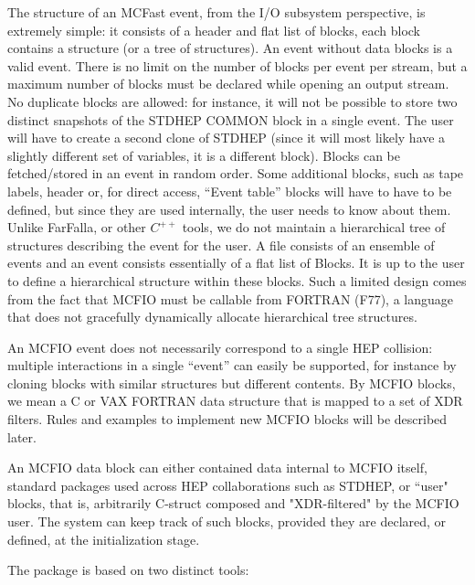 The structure of an MCFast event, from the I/O subsystem perspective, is
extremely simple: it consists of a header and flat list of blocks, each block
contains  a structure (or a tree of structures). An event without data blocks
is a valid event. There is no limit on the number of blocks per event per
stream, but a maximum number of blocks must be declared while opening an output
stream.    No duplicate blocks are allowed:  for instance, it will not be
possible to store two distinct snapshots of the STDHEP COMMON block in a single
event. The user will have to  create a second clone of STDHEP (since it will
most likely have a slightly different set of variables, it is a different
block).  Blocks can be fetched/stored in an  event in random order. Some
additional blocks, such as tape labels, header or, for direct access, ``Event
table'' blocks will have to have to be defined, but since they are used
internally, the user needs to know about them.  Unlike FarFalla, or other
$C^{++}$ tools, we do not maintain a hierarchical tree of structures
describing the event for the user. A file consists of an ensemble of events
and an event consists essentially of a flat list of Blocks. It is up to the
user to define a hierarchical structure within these blocks. Such a limited design
comes from the fact that MCFIO must be callable from FORTRAN (F77), a language
that does not gracefully dynamically allocate hierarchical tree
structures.

	An MCFIO event does not necessarily correspond to a single HEP
collision:  multiple interactions in a single ``event'' can easily be
supported, for instance by cloning blocks with similar structures but
different contents. By MCFIO blocks, we mean a C or VAX FORTRAN data
structure that is mapped to a set of XDR filters. Rules and examples to
implement new MCFIO blocks will be described later.

	An MCFIO data block can either contained data internal to MCFIO itself,
standard packages used across HEP collaborations such as STDHEP, or ``user"
blocks, that is, arbitrarily C-struct composed and "XDR-filtered" by the
MCFIO user. The system can keep track of such blocks, provided they are
declared, or defined, at the initialization stage.

	The package is based on two distinct tools:

